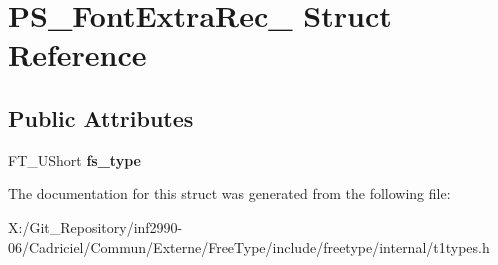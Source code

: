 \hypertarget{struct_p_s___font_extra_rec__}{\section{P\-S\-\_\-\-Font\-Extra\-Rec\-\_\- Struct Reference}
\label{struct_p_s___font_extra_rec__}
}
\subsection*{Public Attributes}
\begin{DoxyCompactItemize}
\item 
\hypertarget{struct_p_s___font_extra_rec___a048e1e57ee974c3e05e9a88476e6b8a9}{F\-T\-\_\-\-U\-Short {\bfseries fs\-\_\-type}}\label{struct_p_s___font_extra_rec___a048e1e57ee974c3e05e9a88476e6b8a9}

\end{DoxyCompactItemize}


The documentation for this struct was generated from the following file\-:\begin{DoxyCompactItemize}
\item 
X\-:/\-Git\-\_\-\-Repository/inf2990-\/06/\-Cadriciel/\-Commun/\-Externe/\-Free\-Type/include/freetype/internal/t1types.\-h\end{DoxyCompactItemize}
